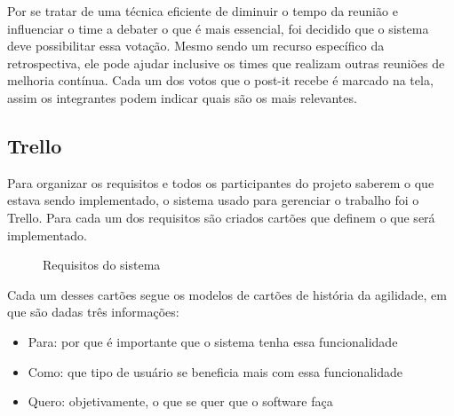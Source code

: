Por se tratar de uma técnica eficiente de diminuir o tempo da reunião e influenciar o time a debater o que é mais essencial, foi decidido que o sistema deve possibilitar essa votação. Mesmo sendo um recurso específico da retrospectiva, ele pode ajudar inclusive os times que realizam outras reuniões de melhoria contínua. Cada um dos votos que o post-it recebe é marcado na tela, assim os integrantes podem indicar quais são os mais relevantes.

\subsection{Trello}

Para organizar os requisitos e todos os participantes do projeto saberem o que estava sendo implementado, o sistema usado para gerenciar o trabalho foi o Trello. Para cada um dos requisitos são criados cartões que definem o que será implementado.

\begin{figure}[H]
  \hspace*{-4em}
  \caption{Requisitos do sistema}\label{figura:requisitos}
\end{figure}

Cada um desses cartões segue os modelos de cartões de história da agilidade, em que são dadas três informações:

\begin{itemize}
	\item Para: por que é importante que o sistema tenha essa funcionalidade
	\item Como: que tipo de usuário se beneficia mais com essa funcionalidade
	\item Quero: objetivamente, o que se quer que o software faça
\end{itemize}

